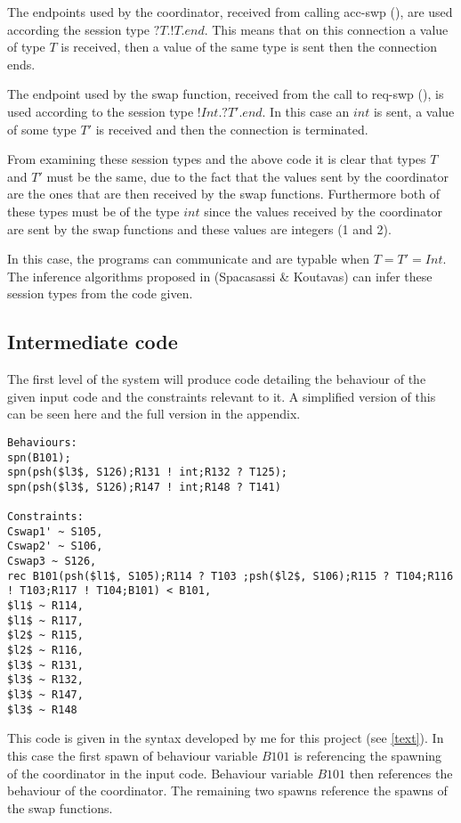 The endpoints used by the coordinator, received from calling acc-swp (), are used according the session type $?T.!T.end$. This means that on this connection a value of type $T$ is received, then a value of the same type is sent then the connection ends. 

The endpoint used by the swap function, received from the call to req-swp (), is used according to the session type $!Int.?T'.end$. In this case an $int$ is sent, a value of some type $T'$ is received and then the connection is terminated. 

From examining these session types and the above code it is clear that types $T$ and $T'$ must be the same, due to the fact that the values sent by the coordinator are the ones that are then received by the swap functions. Furthermore both of these types must be of the type $int$ since the values received by the coordinator are sent by the swap functions and these values are integers (1 and 2).

In this case, the programs can communicate and are typable when $T=T'=Int$. The inference algorithms proposed in (Spacasassi \& Koutavas)\cite{paper1} can infer these session types from the code given. 

\subsection{Intermediate code}

The first level of the system will produce code detailing the behaviour of the given input code and the constraints relevant to it. A simplified version of this can be seen here and the full version in the appendix. 

\begin{lstlisting}
Behaviours:
spn(B101);
spn(psh($l3$, S126);R131 ! int;R132 ? T125);
spn(psh($l3$, S126);R147 ! int;R148 ? T141)

Constraints:
Cswap1' ~ S105,
Cswap2' ~ S106,
Cswap3 ~ S126,
rec B101(psh($l1$, S105);R114 ? T103 ;psh($l2$, S106);R115 ? T104;R116 ! T103;R117 ! T104;B101) < B101,
$l1$ ~ R114,
$l1$ ~ R117,
$l2$ ~ R115,
$l2$ ~ R116,
$l3$ ~ R131,
$l3$ ~ R132,
$l3$ ~ R147,
$l3$ ~ R148
\end{lstlisting}

This code is given in the syntax developed by me for this project (see \ref{text}). In this case the first spawn of behaviour variable $B101$ is referencing the spawning of the coordinator in the input code. Behaviour variable $B101$ then references the behaviour of the coordinator. The remaining two spawns reference the spawns of the swap functions.  

